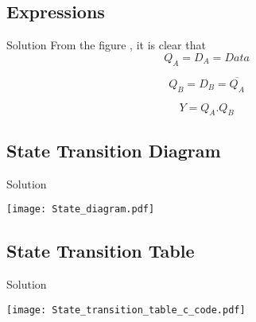\documentclass{beamer}
\begin{document}
 \subsection{Expressions}
 \begin{frame}{Solution}
 From the figure , it is clear that
 \begin{equation}
     Q_A = D_A = Data 
\end{equation}

 \begin{equation}
    Q_B = D_B = \overline{Q_A}
\end{equation}

\begin{equation}
     Y = Q_A.Q_B
\end{equation}
 \end{frame}
 
 \subsection{State Transition Diagram}
 \begin{frame}{Solution}
 \begin{center}
\texttt{[image: State\_diagram.pdf]}
\end{center}
 
     
 \end{frame}

 \subsection{State Transition Table}
 \begin{frame}{Solution}
 \begin{center}
\texttt{[image: State\_transition\_table\_c\_code.pdf]}
\end{center}
 
     
 \end{frame}
\end{document}
